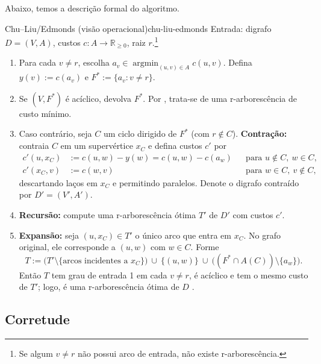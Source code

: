 Abaixo, temos a descrição formal do algoritmo.

\begin{algobox}{Chu–Liu/Edmonds (visão operacional)}{chu-liu-edmonds}
    Entrada: digrafo \(D=(V,A)\), custos \(c:A\to\mathbb{R}_{\ge 0}\), raiz \(r\).\footnote{Se algum \(v\neq r\) não possui arco de entrada, não existe r-arborescência.}
    \begin{enumerate}\setlength{\itemsep}{2pt}
        \item Para cada \(v\neq r\), escolha \(a_v\in\operatorname*{argmin}_{(u,v)\in A} c(u,v)\). Defina \(y(v):=c(a_v)\) e \(F^*:=\{a_v: v\neq r\}.\)
        \item Se \((V,F^*)\) é acíclico, devolva \(F^*\). Por \cite[Obs.~4.36]{kleinberg2006}, trata-se de uma r-arborescência de custo mínimo.
        \item Caso contrário, seja \(C\) um ciclo dirigido de \(F^*\) (com \(r\notin C\)). \textbf{Contração:} contraia \(C\) em um supervértice \(x_C\) e defina custos \(c'\) por
              \begin{align*}
                  c'(u,x_C) & := c(u,w) - y(w) = c(u,w) - c(a_w) &  & \text{para } u\notin C,\ w\in C, \\
                  c'(x_C,v) & := c(w,v)                          &  & \text{para } w\in C,\ v\notin C,
              \end{align*}
              descartando laços em \(x_C\) e permitindo paralelos. Denote o digrafo contraído por \(D'=(V',A')\).
        \item \textbf{Recursão:} compute uma r-arborescência ótima \(T'\) de \(D'\) com custos \(c'\).
        \item \textbf{Expansão:} seja \((u,x_C)\in T'\) o único arco que entra em \(x_C\). No grafo original, ele corresponde a \((u,w)\) com \(w\in C\). Forme
              \[
                  T := \bigl(T'\setminus\{\text{arcos incidentes a } x_C\}\bigr)\ \cup\ \{(u,w)\}\ \cup\ \bigl((F^*\cap A(C))\setminus\{a_w\}\bigr).
              \]
              Então \(T\) tem grau de entrada 1 em cada \(v\neq r\), é acíclico e tem o mesmo custo de \(T'\); logo, é uma r-arborescência ótima de \(D\) \cite[Sec.~4.9]{kleinberg2006,schrijver2003comb}.
    \end{enumerate}
\end{algobox}

\subsection{Corretude}

